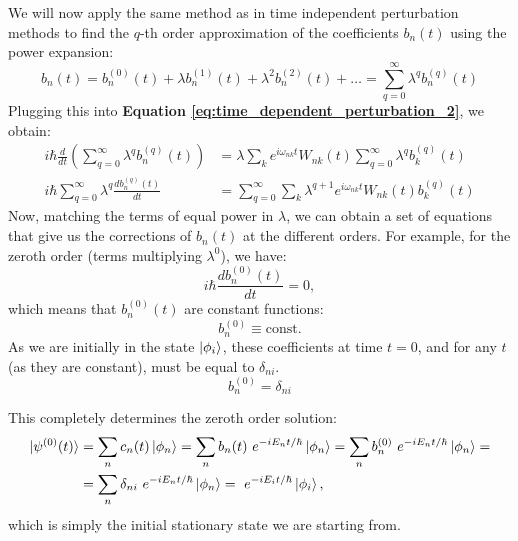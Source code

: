 We will now apply the same method as in time independent perturbation methods to find the $q$-th order approximation of the coefficients $b_n(t)$ using the power expansion:
\begin{equation}
    b_n(t) = b_n^{(0)}(t) + \lambda b_n^{(1)}(t) + \lambda^2 b_n^{(2)}(t) + \dots = \sum_{q=0}^\infty \lambda^q b_n^{(q)}(t)
\end{equation}
Plugging this into \textbf{Equation \ref{eq:time_dependent_perturbation_2}}, we obtain:
\begin{equation} \label{eq:time_dependent_perturbation_3}
    \begin{split}
        i\hbar \frac{d}{dt}\left(\sum_{q=0}^\infty \lambda^q b_n^{(q)}(t)\right)  &= \lambda\sum_{k} e^{i\omega_{nk}t}W_{nk}(t)\sum_{q=0}^\infty \lambda^q b_k^{(q)}(t)\\
        i\hbar \sum_{q=0}^\infty \lambda^q\frac{d b_n^{(q)}(t)}{dt}  &= \sum_{q=0}^\infty\sum_{k} \lambda^{q+1}e^{i\omega_{nk}t}W_{nk}(t)  b_k^{(q)}(t)
    \end{split}
\end{equation}
Now, matching the terms of equal power in $\lambda$, we can obtain a set of equations that give us the corrections of $b_n(t)$ at the different orders. For example, for the zeroth order (terms multiplying $\lambda^0$), we have:
\begin{equation}
    i\hbar \frac{db_n^{(0)}(t)}{dt} = 0,
\end{equation}
which means that $b_n^{(0)}(t)$ are constant functions:
\begin{equation}
    b_n^{(0)} \equiv \text{const.}
\end{equation}
As we are initially in the state $\ket{\phi_i}$, these coefficients at time $t=0$, and for any $t$ (as they are constant), must be equal to $\delta_{ni}$.
\begin{equation}
    b_n^{(0)} = \delta_{ni}
\end{equation}

This completely determines the zeroth order solution:
\begin{equation}
    \begin{split}
        \ket{\psi^{(0)}(t)} &= \sum_n c_n(t) \ket{\phi_n} = \sum_n b_n(t)\ e^{-iE_nt/\hbar} \ket{\phi_n} = \sum_n b_n^{(0)}\ e^{-iE_nt/\hbar} \ket{\phi_n} =\\
        &= \sum_n \delta_{ni}\ e^{-iE_nt/\hbar} \ket{\phi_n} =  \ e^{-iE_it/\hbar} \ket{\phi_i},
    \end{split}
\end{equation}
which is simply the initial stationary state we are starting from.

